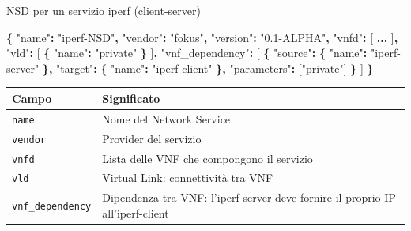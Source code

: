 \documentclass[
  italian,
  openany]{book}
\newenvironment{Shaded}{\begin{snugshade}}{\end{snugshade}}
\newcommand{\DataTypeTok}[1]{\textcolor[rgb]{0.13,0.29,0.53}{#1}}
\newcommand{\ErrorTok}[1]{\textcolor[rgb]{0.64,0.00,0.00}{\textbf{#1}}}
\newcommand{\FunctionTok}[1]{\textcolor[rgb]{0.13,0.29,0.53}{\textbf{#1}}}
\newcommand{\OtherTok}[1]{\textcolor[rgb]{0.56,0.35,0.01}{#1}}
\newcommand{\StringTok}[1]{\textcolor[rgb]{0.31,0.60,0.02}{#1}}
\newcounter{none} %
\begin{document}
\begin{callouttip}{NSD per un servizio iperf (client-server)}

\begin{Shaded}
\begin{Highlighting}[]
\FunctionTok{\{}
  \DataTypeTok{"name"}\FunctionTok{:} \StringTok{"iperf{-}NSD"}\FunctionTok{,}
  \DataTypeTok{"vendor"}\FunctionTok{:} \StringTok{"fokus"}\FunctionTok{,}
  \DataTypeTok{"version"}\FunctionTok{:} \StringTok{"0.1{-}ALPHA"}\FunctionTok{,}
  \DataTypeTok{"vnfd"}\FunctionTok{:} \OtherTok{[} \ErrorTok{...} \OtherTok{]}\FunctionTok{,}
  \DataTypeTok{"vld"}\FunctionTok{:} \OtherTok{[} \FunctionTok{\{} \DataTypeTok{"name"}\FunctionTok{:} \StringTok{"private"} \FunctionTok{\}} \OtherTok{]}\FunctionTok{,}
  \DataTypeTok{"vnf\_dependency"}\FunctionTok{:} \OtherTok{[}
    \FunctionTok{\{}
      \DataTypeTok{"source"}\FunctionTok{:} \FunctionTok{\{} \DataTypeTok{"name"}\FunctionTok{:} \StringTok{"iperf{-}server"} \FunctionTok{\},}
      \DataTypeTok{"target"}\FunctionTok{:} \FunctionTok{\{} \DataTypeTok{"name"}\FunctionTok{:} \StringTok{"iperf{-}client"} \FunctionTok{\},}
      \DataTypeTok{"parameters"}\FunctionTok{:} \OtherTok{[}\StringTok{"private"}\OtherTok{]}
    \FunctionTok{\}}
  \OtherTok{]}
\FunctionTok{\}}
\end{Highlighting}
\end{Shaded}

{\def\LTcaptype{none} %
\begin{longtable}[]{@{}
  >{\raggedright\arraybackslash}p{}
  >{\raggedright\arraybackslash}p{}@{}}
\toprule\noalign{}
\begin{minipage}[b]{\linewidth}\raggedright
Campo
\end{minipage} & \begin{minipage}[b]{\linewidth}\raggedright
Significato
\end{minipage} \\
\midrule\noalign{}
\endhead
\bottomrule\noalign{}
\endlastfoot
\texttt{name} & Nome del Network Service \\
\texttt{vendor} & Provider del servizio \\
\texttt{vnfd} & Lista delle VNF che compongono il servizio \\
\texttt{vld} & Virtual Link: connettività tra VNF \\
\texttt{vnf\_dependency} & Dipendenza tra VNF: l'iperf-server deve
fornire il proprio IP all'iperf-client \\
\end{longtable}
}

\end{callouttip}
\end{document}
